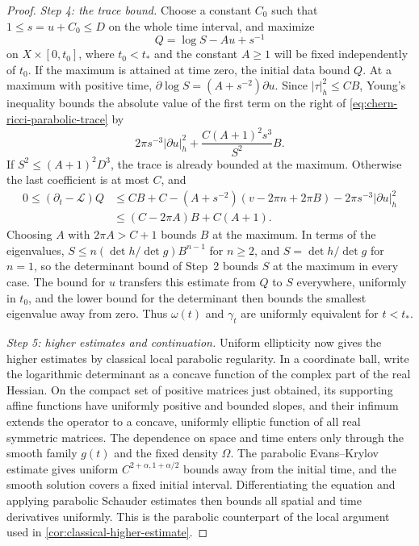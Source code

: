\begin{proof}
\emph{Step 4: the trace bound.} Choose a constant $C_0$ such that $1\leq s=u+C_0\leq D$ on the whole time interval, and maximize
\[
 Q=\log S-Au+s^{-1}
\]
on $X\times[0,t_0]$, where $t_0<t_*$ and the constant $A\geq1$ will be fixed independently of $t_0$. If the maximum is attained at time zero, the initial data bound $Q$. At a maximum with positive time, $\partial\log S=(A+s^{-2})\partial u$. Since $|\tau|_h^2\leq CB$, Young's inequality bounds the absolute value of the first term on the right of \eqref{eq:chern-ricci-parabolic-trace} by
\[
 2\pi s^{-3}|\partial u|_h^2
       +\frac{C(A+1)^2s^3}{S^2}B.
\]
If $S^2\leq(A+1)^2D^3$, the trace is already bounded at the maximum. Otherwise the last coefficient is at most $C$, and
\[
 \begin{split}
 0\leq(\partial_t-\mathcal L)Q
 &\leq CB+C-(A+s^{-2})(v-2\pi n+2\pi B)
                       -2\pi s^{-3}|\partial u|_h^2\\
 &\leq(C-2\pi A)B+C(A+1).
 \end{split}
\]
Choosing $A$ with $2\pi A>C+1$ bounds $B$ at the maximum. In terms of the eigenvalues, $S\leq n(\det h/\det g)B^{n-1}$ for $n\geq2$, and $S=\det h/\det g$ for $n=1$, so the determinant bound of Step~2 bounds $S$ at the maximum in every case. The bound for $u$ transfers this estimate from $Q$ to $S$ everywhere, uniformly in $t_0$, and the lower bound for the determinant then bounds the smallest eigenvalue away from zero. Thus $\omega(t)$ and $\gamma_t$ are uniformly equivalent for $t<t_*$.

\emph{Step 5: higher estimates and continuation.} Uniform ellipticity now gives the higher estimates by classical local parabolic regularity. In a coordinate ball, write the logarithmic determinant as a concave function of the complex part of the real Hessian. On the compact set of positive matrices just obtained, its supporting affine functions have uniformly positive and bounded slopes, and their infimum extends the operator to a concave, uniformly elliptic function of all real symmetric matrices. The dependence on space and time enters only through the smooth family $g(t)$ and the fixed density $\Omega$. The parabolic Evans--Krylov estimate gives uniform $C^{2+\alpha,1+\alpha/2}$ bounds away from the initial time, and the smooth solution covers a fixed initial interval. Differentiating the equation and applying parabolic Schauder estimates then bounds all spatial and time derivatives uniformly. This is the parabolic counterpart of the local argument used in \cref{cor:classical-higher-estimate}.


\end{proof}
